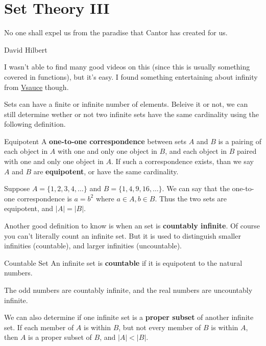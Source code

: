 \chapter{Set Theory III}

\epigraph{No one shall expel us from the paradise that Cantor has created for us.}{David Hilbert}

I wasn't able to find many good videos on this (since this is usually something covered in functions), but it's easy. I found something entertaining about infinity from \href{https://www.youtube.com/watch?v=SrU9YDoXE88}{Vsauce} though.

Sets can have a finite or infinite number of elements. Beleive it or not, we can still determine wether or not two infinite sets have the same cardinality using the following definition.

\begin{boxdefine}{Equipotent}{}
	A {\bf one-to-one correspondence} between sets $A$ and $B$ is a pairing of each object in $A$ with one and only one object in $B$, and each object in $B$ paired with one and only one object in $A$. If such a correspondence exists, than we say $A$ and $B$ are {\bf equipotent}, or have the same cardinality.
\end{boxdefine}

\begin{boxexample}{}{}
	Suppose $A=\{1,2,3,4,\dots\}$ and $B=\{1,4,9,16,\dots\}$. We can say that the one-to-one correspondence is $a=b^2$ where $a \in A, b \in B$. Thus the two sets are equipotent, and $|A|=|B|$.
\end{boxexample}

Another good definition to know is when an set is {\bf countably infinite}. Of course you can't literally count an infinite set. But it is used to distinguish smaller infinities (countable), and larger infinities (uncountable).

\begin{boxdefine}{Countable Set}{}
	An infinite set is {\bf countable} if it is equipotent to the natural numbers. 
\end{boxdefine}

\begin{boxexample}{}{}
	The odd numbers are countably infinite, and the real numbers are uncountably infinite.
\end{boxexample}

We can also determine if one infinite set is a {\bf proper subset} of another infinite set. If each member of $A$ is within $B$, but not every member of $B$ is within $A$, then $A$ is a proper subset of $B$, and $|A| < |B|$.

